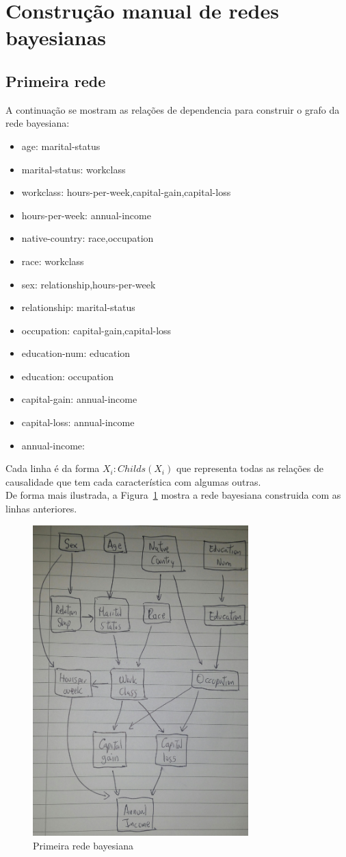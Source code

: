 \section{Construção manual de redes bayesianas}

\subsection{Primeira rede}
	A continuação se mostram as relações de dependencia para construir o grafo da rede bayesiana:
	\begin{itemize}
		\item age: marital-status
		\item marital-status: workclass
		\item workclass: hours-per-week,capital-gain,capital-loss
		\item hours-per-week: annual-income
		\item native-country: race,occupation
		\item race: workclass
		\item sex: relationship,hours-per-week
		\item relationship: marital-status
		\item occupation: capital-gain,capital-loss
		\item education-num: education
		\item education: occupation
		\item capital-gain: annual-income
		\item capital-loss: annual-income
		\item annual-income:
	\end{itemize}
	Cada linha é da forma $X_i : Childs( X_i )$ que representa todas as relações de causalidade que tem cada característica com algumas outras.\\
	De forma mais ilustrada, a Figura~\ref{fig:rede1} mostra a rede bayesiana construida com as linhas anteriores.
	\begin{figure}[ht]
		\centering
		\includegraphics[height=12cm]{images/rede1}
		\caption{Primeira rede bayesiana}
		\label{fig:rede1}
	\end{figure}
